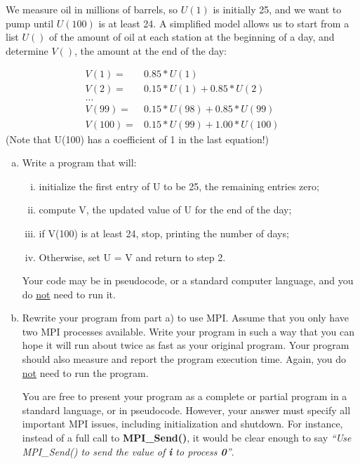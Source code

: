\documentclass[11pt,letterpaper]{article}
\begin{document}
\medskip

We measure oil in millions of barrels, so $U(1)$ is initially 25, and we want to pump until
$U(100)$ is at least 24.  A simplified model allows us to start from a list $U()$ of the amount of oil at each station at the beginning of a day, and determine $V()$, the amount
at the end of the day:  

\begin{eqnarray*}
V(1) =& 0.85 * U(1)\\
V(2) =& 0.15 * U(1) + 0.85*U(2)\\
...&\\
V(99) =& 0.15 * U(98) + 0.85 * U(99)\\
V(100) =& 0.15*U(99) + 1.00 * U(100)
\end{eqnarray*}
(Note that U(100) has a coefficient of 1 in the last equation!)

\begin{enumerate}[a)]

\item Write a program that will:
\begin{enumerate}[(i)]
  \item{initialize the first entry of U to be 25, the remaining entries zero;}
  \item{compute V, the updated value of U for the end of the day;}
  \item{if V(100) is at least 24, stop, printing the number of days;}
  \item{Otherwise, set U = V and return to step 2.}
\end{enumerate}
Your code may be in pseudocode, or a standard computer language, and you do {\underline{not}} need to run it.

\item Rewrite your program from part a) to use MPI.  Assume that you only have two MPI processes available.  Write your program in such a way that you can hope it will run about twice as fast as your original program.  Your program should also measure and report the program execution time.  Again, you do {\underline{not}} need to run the program.

You are free to present your program as a complete or partial program in a standard language,
or in pseudocode.  However, your answer must specify all important MPI issues, including initialization and shutdown. For instance, instead of a full call to {\bf{MPI\_Send()}}, it would be clear enough to say {\it{``Use MPI\_Send() to send the value of {\bf{i}} to process {\bf{0}}''}}.

\end{enumerate}
\end{document}
